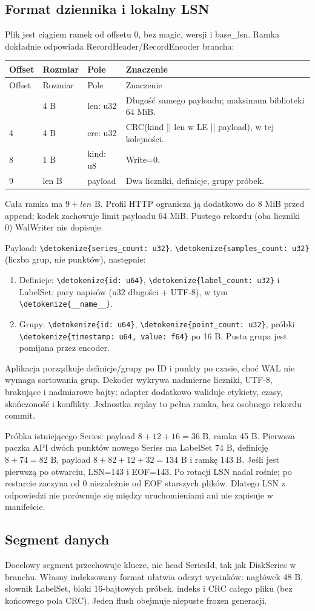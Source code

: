 \documentclass[11pt,a4paper]{article}
\newcommand{\code}[1]{\expandafter\nolinkurl\expandafter{\detokenize{#1}}}
\newcommand{\tabhead}[1]{\toprule #1\\ \midrule\endfirsthead
  \toprule #1\\ \midrule\endhead \bottomrule\endfoot}
\begin{document}
\subsection{Format dziennika i lokalny LSN}
\label{sec:wal}
Plik jest ciągiem ramek od offsetu 0, bez magic, wersji i base\_lsn.
Ramka dokładnie odpowiada RecordHeader/RecordEncoder brancha:
\begin{longtable}{P{18mm}P{23mm}P{32mm}P{83mm}}
\tabhead{Offset & Rozmiar & Pole & Znaczenie}
0 & 4 B & len: u32 & Długość samego payloadu; maksimum biblioteki 64 MiB.\\
4 & 4 B & crc: u32 & CRC(kind || len w LE || payload), w tej kolejności.\\
8 & 1 B & kind: u8 & Write=0.\\
9 & len B & payload & Dwa liczniki, definicje, grupy próbek.\\
\end{longtable}
Cała ramka ma $9+len$ B. Profil HTTP ogranicza ją dodatkowo do 8 MiB
przed append; kodek zachowuje limit payloadu 64 MiB.
Pustego rekordu (oba liczniki 0) WalWriter nie dopisuje.

Payload: \code{series_count: u32}, \code{samples_count: u32}
(liczba grup, nie punktów), następnie:
\begin{enumerate}
\item Definicje: \code{id: u64}, \code{label_count: u32} i LabelSet:
pary napisów (u32 długości + UTF-8), w tym \code{__name__}.
\item Grupy: \code{id: u64}, \code{point_count: u32},
próbki \code{timestamp: u64, value: f64} po 16 B.
Pusta grupa jest pomijana przez encoder.
\end{enumerate}
Aplikacja porządkuje definicje/grupy po ID i punkty po czasie, choć
WAL nie wymaga sortowania grup. Dekoder wykrywa nadmierne liczniki,
UTF-8, brakujące i nadmiarowe bajty; adapter dodatkowo waliduje etykiety,
czasy, skończoność i konflikty. Jednostka replay to pełna ramka,
bez osobnego rekordu commit.

Próbka istniejącego Series: payload $8+12+16=36$ B, ramka 45 B.
Pierwsza paczka API dwóch punktów nowego Series ma LabelSet 74 B,
definicję $8+74=82$ B, payload $8+82+12+32=134$ B i ramkę 143 B.
Jeśli jest pierwszą po otwarciu, LSN=143 i EOF=143.
Po rotacji LSN nadal rośnie; po restarcie zaczyna od 0 niezależnie od EOF
starszych plików. Dlatego LSN z odpowiedzi nie porównuje się między
uruchomieniami ani nie zapisuje w manifeście.

\subsection{Segment danych}
\label{sec:segment}
Docelowy segment przechowuje klucze, nie head SeriesId, tak jak
DiskSeries w branchu. Własny indeksowany format ułatwia odczyt wycinków:
nagłówek 48 B, słownik LabelSet, bloki 16-bajtowych próbek,
indeks i CRC całego pliku (bez końcowego pola CRC).
Jeden flush obejmuje niepuste frozen generacji.
\end{document}
